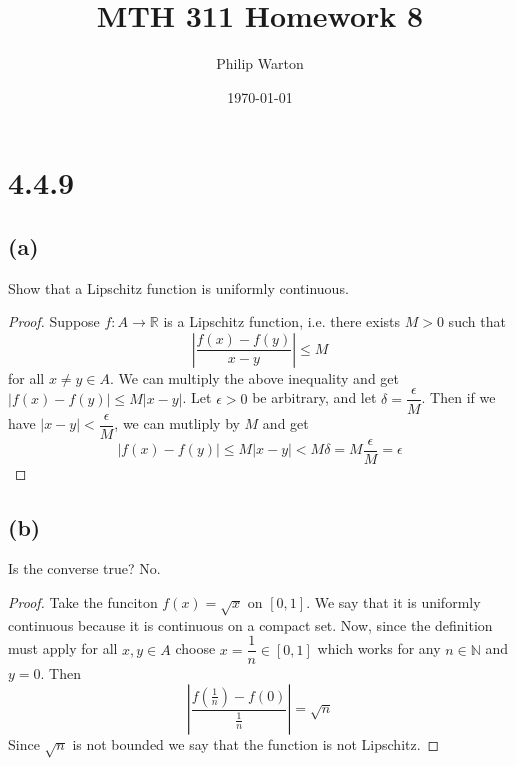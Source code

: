 \documentclass{article}
\begin{document}
\title{MTH 311 Homework 8}
\author{Philip Warton}
\date{\today}
\maketitle

\section*{4.4.9}
\subsection*{(a)}
Show that a Lipschitz function is uniformly continuous.
\begin{proof}
Suppose $f: A \rightarrow \mathbb{R}$ is a Lipschitz function, i.e. there exists $M>0$ such that
\[ \left|\frac{f(x)-f(y)}{x-y}\right| \leqslant M\]
for all $x \neq y \in A$. We can multiply the above inequality and get $|f(x)-f(y)| \leqslant M |x-y|$. Let $\epsilon > 0$ be arbitrary, and let $\delta = \dfrac{\epsilon}{M}$. Then if we have $|x-y| < \dfrac{\epsilon}{M}$, we can mutliply by $M$ and get 
\[ |f(x)-f(y)| \leqslant M|x-y| < M \delta = M \dfrac{\epsilon}{M} = \epsilon\]
\end{proof}

\subsection*{(b)}
Is the converse true? No.
\begin{proof}
Take the funciton $f(x) = \sqrt{x}$ on $[0,1]$. We say that it is uniformly continuous because it is continuous on a compact set. Now, since the definition must apply for all $x,y \in A$ choose $x = \dfrac{1}{n} \in [0,1]$ which works for any $n \in \mathbb{N}$ and $y = 0$. Then
\[ \left| \frac{f(\frac{1}{n}) - f(0)}{\frac{1}{n}}\right| = \sqrt{n}\] 
Since $\sqrt{n}$ is not bounded we say that the function is not Lipschitz.
\end{proof}
\end{document}
